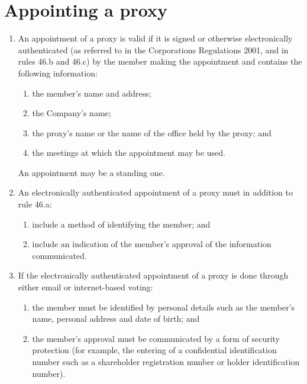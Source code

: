 \section{Appointing a proxy}

\begin{enumerate}[label=(\alph*)]
    \item An appointment of a proxy is valid if it is signed or otherwise electronically authenticated (as referred to in the Corporations Regulations 2001, and in rules 46.b and 46.c) by the member making the appointment and contains the following information:
    \begin{enumerate}[label=(\roman*)]
        \item the member's name and address;
        \item the Company's name;
        \item the proxy's name or the name of the office held by the proxy; and
        \item the meetings at which the appointment may be used.
    \end{enumerate}
    
    An appointment may be a standing one.
    
    \item An electronically authenticated appointment of a proxy must in addition to rule 46.a:
    \begin{enumerate}[label=(\roman*)]
        \item include a method of identifying the member; and
        \item include an indication of the member's approval of the information communicated.
    \end{enumerate}
    
    \item If the electronically authenticated appointment of a proxy is done through either email or internet-based voting:
    \begin{enumerate}[label=(\roman*)]
        \item the member must be identified by personal details such as the member's name, personal address and date of birth; and
        \item the member's approval must be communicated by a form of security protection (for example, the entering of a confidential identification number such as a shareholder registration number or holder identification number).
    \end{enumerate}
    

\end{enumerate}
